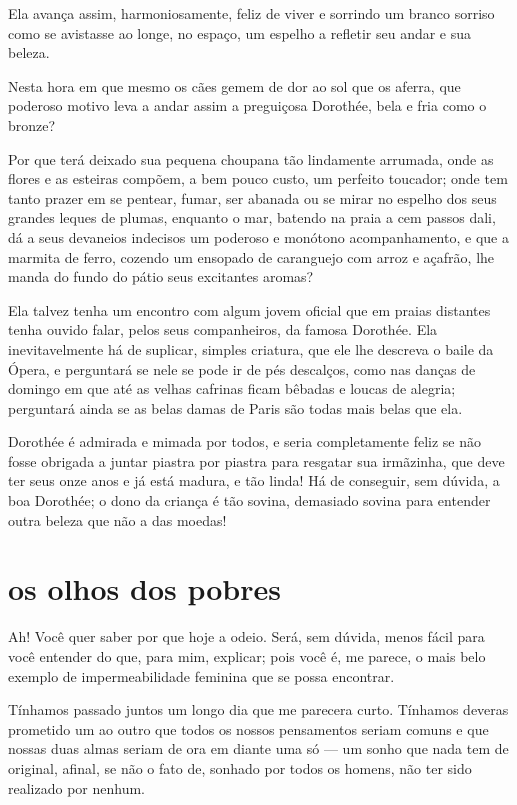 Ela avança assim, harmoniosamente, feliz de viver e sorrindo um branco
sorriso como se avistasse ao longe, no espaço, um espelho a refletir
seu andar e sua beleza.

Nesta hora em que mesmo os cães gemem de dor ao sol que os aferra,
que poderoso motivo leva a andar assim a preguiçosa Dorothée, bela e fria
como o bronze?

Por que terá deixado sua pequena choupana tão lindamente arrumada, onde
as flores e as esteiras compõem, a bem pouco custo, um perfeito
toucador; onde tem tanto prazer em se pentear, fumar, ser
abanada ou se  mirar no espelho dos seus grandes leques de plumas,
enquanto o mar, batendo na praia a cem passos dali, dá a seus devaneios
indecisos um poderoso e monótono acompanhamento, e que a marmita de
ferro, cozendo um ensopado de caranguejo com arroz e açafrão, lhe
manda do fundo do pátio seus excitantes aromas?

Ela talvez tenha um encontro com algum jovem oficial que em praias
distantes tenha ouvido falar, pelos seus companheiros, da famosa
Dorothée. Ela inevitavelmente há de suplicar, simples
criatura, que ele lhe descreva o baile da Ópera, e perguntará se
nele se pode ir de pés descalços, como nas danças de domingo em
que até as velhas cafrinas ficam bêbadas e loucas de alegria;
perguntará ainda se as belas damas de Paris são todas mais belas que
ela.

Dorothée é admirada e mimada por todos, e seria completamente feliz se
não fosse obrigada a juntar piastra por piastra para resgatar sua
irmãzinha, que deve ter seus onze anos e já está madura, e tão
linda! Há de conseguir, sem dúvida, a boa Dorothée; o dono da criança é
tão sovina, demasiado sovina para entender outra beleza que não a das
moedas!

\quebra\section[Os olhos dos pobres]{os olhos dos pobres}

Ah! Você quer saber por que hoje a odeio. Será, sem dúvida, menos fácil
para você entender do que, para mim, explicar; pois você é, me
parece, o mais belo exemplo de impermeabilidade feminina que se possa
encontrar.

Tínhamos passado juntos um longo dia que me parecera curto. Tínhamos
deveras prometido um ao outro que todos os nossos pensamentos seriam
comuns e que nossas duas almas seriam de ora em diante uma só ---
um sonho que nada tem de original, afinal, se não o fato de, sonhado 
por todos os homens, não ter sido realizado por nenhum.

